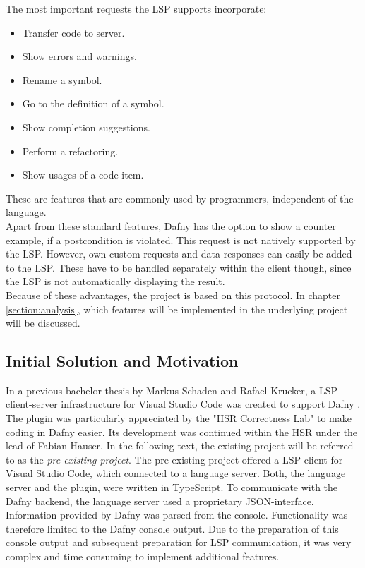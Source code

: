 The most important requests the LSP supports incorporate:
\begin{itemize}
    \item Transfer code to server.
    \item Show errors and warnings.
    \item Rename a symbol.
    \item Go to the definition of a symbol.
    \item Show completion suggestions.
    \item Perform a refactoring.
    \item Show usages of a code item.
\end{itemize}

These are features that are commonly used by programmers, independent of the language.\\

Apart from these standard features, Dafny has the option to show a counter example, if a postcondition is violated.
This request is not natively supported by the LSP.
However, own custom requests and data responses can easily be added to the LSP.
These have to be handled separately within the client though, since the LSP is not automatically displaying the result. \\

Because of these advantages, the project is based on this protocol.
In chapter \ref{section:analysis}, which features will be implemented in the underlying project will be discussed.

\subsection{Initial Solution and Motivation}
\label{section:introduction:initialsolution}
In a previous bachelor thesis by Markus Schaden and Rafael Krucker, a LSP client-server infrastructure for Visual Studio Code was created to support Dafny \cite{ba}.
The plugin was particularly appreciated by the "HSR Correctness Lab" \cite{correctnessLab} to make coding in Dafny easier.
Its development was continued within the HSR under the lead of Fabian Hauser.
In the following text, the existing project will be referred to as the \textit{pre-existing project}. 
The pre-existing project offered a LSP-client for Visual Studio Code, which connected to a language server.
Both, the language server and the plugin, were written in TypeScript.
To communicate with the Dafny backend, the language server used a proprietary JSON-interface.
Information provided by Dafny was parsed from the console.
Functionality was therefore limited to the Dafny console output.
Due to the preparation of this console output and subsequent preparation for LSP communication,
it was very complex and time consuming to implement additional features. \\

